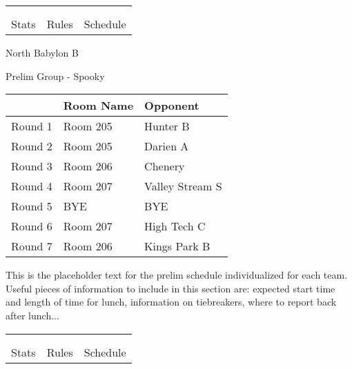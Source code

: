 \documentclass{article}%
\begin{document}
\vspace*{30pt}%
\newline%
%
\begin{tabularx}{\textwidth}{YYY}%
  &  &  \\%
\\%
Stats&Rules&Schedule\\%
\end{tabularx}%
\newpage%
%
\begin{center}%
\begin{Huge}%
North Babylon B%
\end{Huge}%
\vspace*{12pt}%
\linebreak%
\begin{Large}%
Prelim Group {-} Spooky%
\end{Large}%
\end{center}%
\vspace*{4pt}%
\begin{tabularx}{\textwidth}{|c|Y|Y|}%
\hline%
&Room Name&Opponent\\%
\hline%
Round 1&Room 205&Hunter B\\%
Round 2&Room 205&Darien A\\%
Round 3&Room 206&Chenery\\%
Round 4&Room 207&Valley Stream S\\%
Round 5&BYE&BYE\\%
Round 6&Room 207&High Tech C\\%
Round 7&Room 206&Kings Park B\\%
\hline%
\end{tabularx}%
\vspace*{30pt}%
\linebreak%
This is the placeholder text for the prelim schedule individualized for each team. Useful pieces of information to include in this section are: expected start time and length of time for lunch, information on tiebreakers, where to report back after lunch...%
\vspace*{30pt}%
\newline%
%
\begin{tabularx}{\textwidth}{YYY}%
  &  &  \\%
\\%
Stats&Rules&Schedule\\%
\end{tabularx}%
\end{document}
